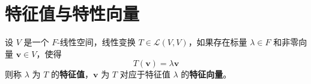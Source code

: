 \section{特征值与特性向量}

\begin{definition}
    设 $V$ 是一个 $F$-线性空间，线性变换 $T\in \mathcal{L}(V,V)$，如果存在标量 $\lambda\in F$ 和非零向量 $\mathbf{v}\in V$，使得
    \[
        T(\mathbf{v}) = \lambda \mathbf{v}
    \]
    则称 $\lambda$ 为 $T$ 的\textbf{特征值}，$\mathbf{v}$ 为 $T$ 对应于特征值 $\lambda$ 的\textbf{特征向量}。
    \label{def:eigenvalue_and_eigenvector}
\end{definition}

\newpage